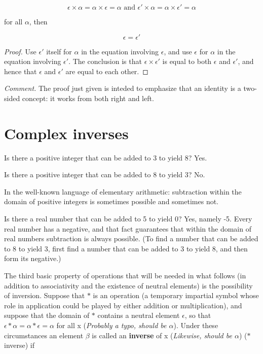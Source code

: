 \begin{equation}
    \epsilon \times \alpha = \alpha \times \epsilon = \alpha \text{ and } \epsilon' \times \alpha = \alpha \times \epsilon' = \alpha
\end{equation}

for all $\alpha$, then

\begin{equation}
    \epsilon = \epsilon'
\end{equation}

\begin{proof}
    Use $\epsilon'$ itself for $\alpha$ in the equation involving $\epsilon$, and use $\epsilon$ for $\alpha$ in the equation involving $\epsilon'$. The conclusion is that $\epsilon \times \epsilon'$ is equal to both $\epsilon$ and $\epsilon'$, and hence that $\epsilon$ and $\epsilon'$ are equal to each other.
\end{proof}

\textit{Comment.} The proof just given is inteded to emphasize that an identity is a two-sided concept: it works from both right and left.

\section{Complex inverses}

Is there a positive integer that can be added to 3 to yield 8? Yes.

Is there a positive integer that can be added to 8 to yield 3? No.

In the well-known language of elementary arithmetic: subtraction within the domain of positive integers is sometimes possible and sometimes not.

Is there a real number that can be added to 5 to yield 0? Yes, namely -5. Every real number has a negative, and that fact guarantees that within the domain of real numbers subtraction is always possible. (To find a number that can be added to 8 to yield 3, first find a number that can be added to 3 to yield 8, and then form its negative.)

The third basic property of operations that will be needed in what follows (in addition to associativity and the existence of neutral elements) is the possibility of inversion. Suppose that $\ast$ is an operation (a temporary impartial symbol whose role in application could be played by either addition or multiplication), and suppose that the domain of $\ast$ contains a neutral element $\epsilon$, so that $\epsilon \ast \alpha = \alpha \ast \epsilon = \alpha$ for all x (\textit{Probably a typo, should be $\alpha$}). Under these circumstances an element $\beta$ is called an \textbf{inverse} of x (\textit{Likewise, should be $\alpha$}) ($\ast$ inverse) if

